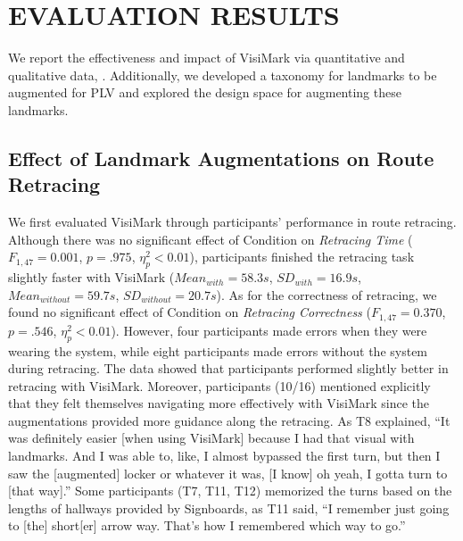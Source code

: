 \section{EVALUATION RESULTS}
We report the effectiveness and impact of VisiMark via quantitative and qualitative data, . Additionally, we developed a taxonomy for landmarks to be augmented for PLV and explored the design space for augmenting these landmarks.

\subsection{Effect of Landmark Augmentations on Route Retracing}
We first evaluated VisiMark through participants' performance in route retracing. %
Although there was no significant effect of Condition on \textit{Retracing Time} ($F_{1,47} = 0.001$, $p = .975$, $\eta _p^2 < 0.01$), participants finished the retracing task slightly faster with VisiMark ($Mean_{with}=58.3s$, $SD_{with}=16.9s$, $Mean_{without}=59.7s$, $SD_{without}=20.7s$). As for the correctness of retracing, we found no significant effect of Condition on \textit{Retracing Correctness} ($F_{1,47} = 0.370$, $p = .546$, $\eta _p^2 < 0.01$). However, four participants made errors when they were wearing the system, while eight participants made errors without the system during retracing. The data showed that participants performed slightly better in retracing with VisiMark. Moreover, participants (10/16) mentioned explicitly that they felt themselves navigating more effectively with VisiMark since the augmentations provided more guidance along the retracing. As T8 explained, ``It was definitely easier [when using VisiMark] because I had that visual with landmarks. And I was able to, like, I almost bypassed the first turn, but then I saw the [augmented] locker or whatever it was, [I know] oh yeah, I gotta turn to [that way].'' Some participants (T7, T11, T12) memorized the turns based on the lengths of hallways provided by Signboards, as T11 said, ``I remember just going to [the] short[er] arrow way. That's how I remembered which way to go.''



